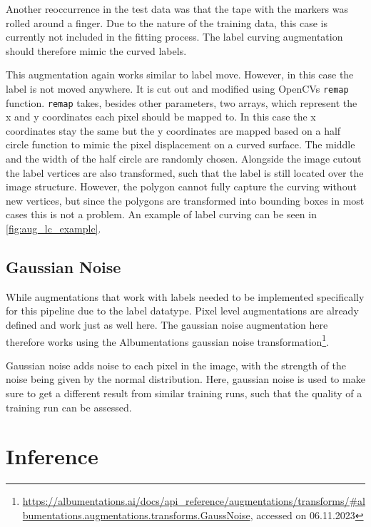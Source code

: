 \documentclass[10pt]{book}
\begin{document}
Another reoccurrence in the test data was that the tape with the markers was rolled around a finger. Due to the nature of the training data, this case is currently not included in the fitting process. The label curving augmentation should therefore mimic the curved labels.

This augmentation again works similar to label move. However, in this case the label is not moved anywhere. It is cut out and modified using \acp{OpenCV} \texttt{remap} function. \texttt{remap} takes, besides other parameters, two arrays, which represent the x and y coordinates each pixel should be mapped to. In this case the x coordinates stay the same but the y coordinates are mapped based on a half circle function to mimic the pixel displacement on a curved surface. The middle and the width of the half circle are randomly chosen. Alongside the image cutout the label vertices are also transformed, such that the label is still located over the image structure. However, the polygon cannot fully capture the curving without new vertices, but since the polygons are transformed into bounding boxes in most cases this is not a problem. An example of label curving can be seen in \autoref{fig:aug_lc_example}.

\subsection{Gaussian Noise}

While augmentations that work with labels needed to be implemented specifically for this pipeline due to the label datatype. Pixel level augmentations are already defined and work just as well here. The gaussian noise augmentation here therefore works using the Albumentations gaussian noise transformation\footnote{\url{https://albumentations.ai/docs/api\_reference/augmentations/transforms/\#albumentations.augmentations.transforms.GaussNoise}, accessed on 06.11.2023}. 

Gaussian noise adds noise to each pixel in the image, with the strength of the noise being given by the normal distribution. Here, gaussian noise is used to make sure to get a different result from similar training runs, such that the quality of a training run can be assessed.


\section{Inference}
\end{document}
